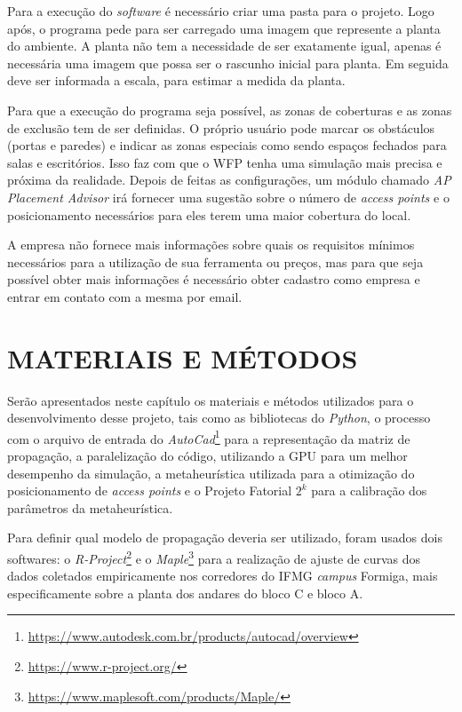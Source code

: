\documentclass[
	12pt,				%
	twoside,			%
	a4paper,			%
	english,			%
	french,				%
	spanish,			%
	brazil				%
	]{abntex2}
\begin{document}
Para a execução do \emph{software} é necessário criar uma pasta para o
projeto. Logo após, o programa pede para ser carregado uma imagem que
represente a planta do ambiente. A planta não tem a necessidade de ser
exatamente igual, apenas é necessária uma imagem que possa ser o
rascunho inicial para planta. Em seguida deve ser informada a escala,
para estimar a medida da planta.

Para que a execução do programa seja possível, as zonas de coberturas e
as zonas de exclusão tem de ser definidas. O próprio usuário pode marcar
os obstáculos (portas e paredes) e indicar as zonas especiais como sendo
espaços fechados para salas e escritórios. Isso faz com que o WFP tenha
uma simulação mais precisa e próxima da realidade. Depois de feitas as
configurações, um módulo chamado \emph{AP Placement Advisor} irá
fornecer uma sugestão sobre o número de \emph{access points} e o
posicionamento necessários para eles terem uma maior cobertura do local.

A empresa não fornece mais informações sobre quais os requisitos mínimos
necessários para a utilização de sua ferramenta ou preços, mas para que
seja possível obter mais informações é necessário obter cadastro como
empresa e entrar em contato com a mesma por email.

\chapter{MATERIAIS E MÉTODOS}\label{materiais-e-muxe9todos}

Serão apresentados neste capítulo os materiais e métodos utilizados para
o desenvolvimento desse projeto, tais como as bibliotecas do
\emph{Python}, o processo com o arquivo de entrada do
\emph{AutoCad}\footnote{\url{https://www.autodesk.com.br/products/autocad/overview}}
para a representação da matriz de propagação, a paralelização do código,
utilizando a GPU para um melhor desempenho da simulação, a
metaheurística utilizada para a otimização do posicionamento de
\emph{access points} e o Projeto Fatorial \(2^{k}\) para a calibração
dos parâmetros da metaheurística.

Para definir qual modelo de propagação deveria ser utilizado, foram
usados dois softwares: o \emph{R-Project}\footnote{\url{https://www.r-project.org/}}
e o \emph{Maple}\footnote{\url{https://www.maplesoft.com/products/Maple/}}
para a realização de ajuste de curvas dos dados coletados empiricamente
nos corredores do IFMG \emph{campus} Formiga, mais especificamente sobre
a planta dos andares do bloco C e bloco A.
\end{document}
